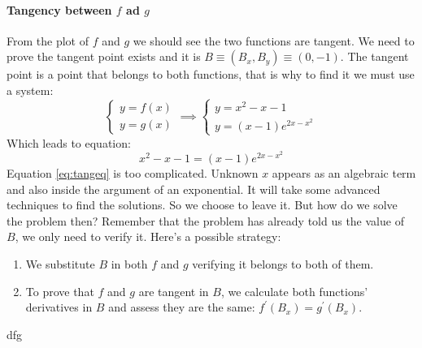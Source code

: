 \paragraph[Problem 5]{Tangency between $f$ ad $g$}
\label{par:subp5_1}
From the plot of $f$ and $g$ we should see the two functions are tangent. We need to prove
the tangent point exists and it is $B \equiv (B_x,B_y) \equiv (0,-1)$.
The tangent point is a point that
belongs to both functions, that is why to find it we must use a system:
\begin{equation*}
    \begin{cases}
        y = f(x)\\
        y = g(x)
    \end{cases}
    \implies
    \begin{cases}
        y = x^2 - x - 1\\
        y = (x - 1)e^{2x - x^2}
    \end{cases}
\end{equation*}
Which leads to equation:
\begin{equation}\label{eq:tangeq}
    x^2 - x - 1 = (x - 1)e^{2x - x^2}
\end{equation}
Equation \ref{eq:tangeq} is too complicated. Unknown $x$ appears as an algebraic term and
also inside the argument of an exponential. It will
take some advanced techniques to find the solutions.
So we choose to leave it. But how do we solve
the problem then?
Remember that the problem has already told us the value of $B$, we
only need to verify it. Here's a possible strategy:
\begin{enumerate}
    \item We substitute $B$ in both $f$ and $g$ verifying it belongs to both of them.
    \item To prove that $f$ and $g$ are tangent in $B$, we calculate
        both functions' derivatives in $B$ and assess they are the
        same:
        $f^\prime(B_x) = g^\prime(B_x)$.
\end{enumerate}
dfg
